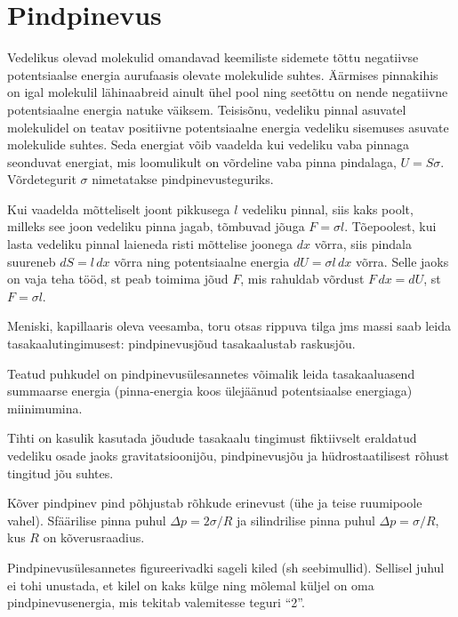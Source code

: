\documentclass[a4paper,11pt,twocolumn]{article}
\begin{document}
\section{Pindpinevus}
Vedelikus olevad molekulid omandavad keemiliste sidemete tõttu negatiivse potentsiaalse energia aurufaasis olevate molekulide suhtes. Äärmises pinnakihis on igal molekulil lähinaabreid ainult ühel pool ning seetõttu on nende negatiivne potentsiaalne energia natuke väiksem. Teisisõnu, vedeliku pinnal asuvatel molekulidel on teatav positiivne potentsiaalne energia vedeliku sisemuses asuvate molekulide suhtes. Seda energiat võib vaadelda kui vedeliku vaba pinnaga seonduvat energiat, mis loomulikult on võrdeline vaba pinna pindalaga, \( U = S\sigma \). Võrdetegurit \( \sigma \) nimetatakse pindpinevusteguriks.

Kui vaadelda mõtteliselt joont pikkusega \( l \) vedeliku pinnal, siis kaks poolt, milleks see joon vedeliku pinna jagab, tõmbuvad jõuga \( F = \sigma l \). Tõepoolest, kui lasta vedeliku pinnal
laieneda risti mõttelise joonega \( dx \) võrra, siis
pindala suureneb \( dS = l\,dx \) võrra ning potentsiaalne energia
\( dU = \sigma l\,dx \) võrra. Selle jaoks on vaja teha tööd, st peab toimima jõud \( F \), mis rahuldab võrdust \( F\,dx = dU \), st \( F = \sigma l \).

Meniski, kapillaaris oleva veesamba, toru otsas rippuva tilga jms massi saab leida tasakaalutingimusest: pindpinevusjõud tasakaalustab raskusjõu.

Teatud puhkudel on pindpinevusülesannetes võimalik leida tasakaaluasend summaarse energia (pinna-energia koos ülejäänud potentsiaalse energiaga) miinimumina.

Tihti on kasulik kasutada jõudude tasakaalu tingimust fiktiivselt eraldatud vedeliku osade jaoks gravitatsioonijõu, pindpinevusjõu ja hüdrostaatilisest rõhust tingitud jõu suhtes.

Kõver pindpinev pind põhjustab rõhkude erinevust (ühe ja teise ruumipoole vahel). Sfäärilise pinna puhul \( \Delta p = 2\sigma/R \) ja silindrilise pinna puhul \( \Delta p = \sigma/R \), kus \( R \) on kõverusraadius.

Pindpinevusülesannetes figureerivadki sageli kiled (sh seebimullid). Sellisel juhul ei tohi unustada, et kilel on kaks külge ning mõlemal küljel on oma pindpinevusenergia, mis tekitab valemitesse teguri \enquote{2}.
\end{document}
